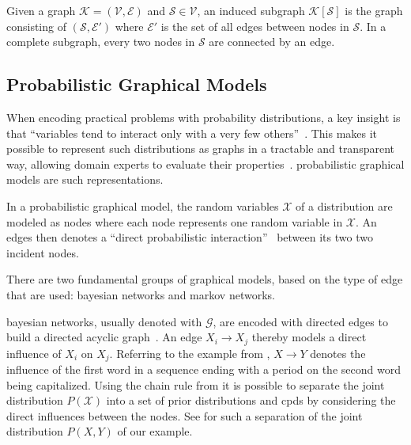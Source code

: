 Given a \gls{graph} $\mathcal{K} = (\mathcal{V},\mathcal{E})$ and $\mathcal{S}\in\mathcal{V}$, an induced \gls{subgraph} $\mathcal{K}[\mathcal{S}]$ is the \gls{graph} consisting of $(\mathcal{S},\mathcal{E'})$ where $\mathcal{E'}$ is the set of all \glspl{edge} between \glspl{node} in $\mathcal{S}$.
In a complete \gls{subgraph}, every two \glspl{node} in $\mathcal{S}$ are connected by an \gls{edge}.

\subsection{Probabilistic Graphical Models}\label{subsec:graphical-models}
When encoding practical problems with \glspl{probability distribution}, a key insight is that ``variables tend to interact only with a very few others''~\citep{koller2009probabilistic}.
This makes it possible to represent such distributions as graphs in a tractable and transparent way, allowing domain experts to evaluate their properties~\citep{koller2009probabilistic}.
\Glspl{probabilistic graphical model} are such representations.

\bigskip

In a \gls{probabilistic graphical model}, the \glspl{random variable} $\mathcal{X}$ of a distribution are modeled as \glspl{node} where each \gls{node} represents one \gls{random variable} in $\mathcal{X}$. An \glspl{edge} then denotes a ``direct probabilistic interaction''~\citep{koller2009probabilistic} between its two two incident \glspl{node}.

There are two fundamental groups of graphical models, based on the type of edge that are used: \glspl{bayesian network} and \glspl{markov network}.

\bigskip

\Glspl{bayesian network}, usually denoted with $\mathcal{G}$, are encoded with directed \glspl{edge} to build a directed acyclic graph~\citep{koller2009probabilistic}.
An \gls{edge} $X_i\to X_j$ thereby models a direct influence of $X_i$ on $X_j$.
Referring to the example from , $X\to Y$ denotes the influence of the first word in a sequence ending with a period on the second word being capitalized.
Using the chain rule from  it is possible to separate the \gls{joint distribution} $P(\mathcal{X})$ into a set of \glspl{prior distribution} and \glspl{cpd} by considering the direct influences between the \glspl{node}.
See  for such a separation of the \gls{joint distribution} $P(X,Y)$ of our example.

